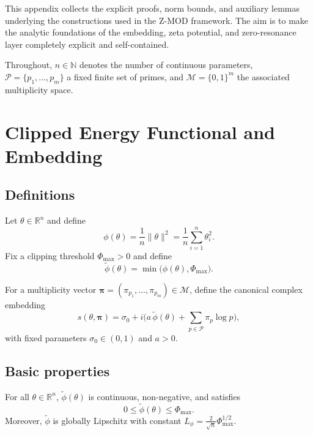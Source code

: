 \documentclass[11pt]{article}
\begin{document}
This appendix collects the explicit proofs, norm bounds, and auxiliary lemmas underlying the constructions used in the Z-MOD framework. The aim is to make the analytic foundations of the embedding, zeta potential, and zero-resonance layer completely explicit and self-contained.

Throughout, $n\in\mathbb{N}$ denotes the number of continuous parameters, $\mathcal{P}=\{p_1,\dots,p_m\}$ a fixed finite set of primes, and $\mathcal{M}=\{0,1\}^m$ the associated multiplicity space.

\section{Clipped Energy Functional and Embedding}

\subsection{Definitions}

Let $\theta\in\mathbb{R}^n$ and define
\[
  \phi(\theta) = \frac{1}{n}\|\theta\|^2 = \frac{1}{n}\sum_{i=1}^n \theta_i^2.
\]
Fix a clipping threshold $\Phi_{\max} > 0$ and define
\[
  \tilde{\phi}(\theta) = \min\big(\phi(\theta),\Phi_{\max}\big).
\]

For a multiplicity vector $\bm{\pi} = (\pi_{p_1},\dots,\pi_{p_m})\in\mathcal{M}$, define the canonical complex embedding
\begin{equation}
  s(\theta,\bm{\pi})
    = \sigma_0 + i\bigg(a\,\tilde{\phi}(\theta) + \sum_{p\in\mathcal{P}} \pi_p \log p\bigg),
  \label{A:eq:embedding}
\end{equation}
with fixed parameters $\sigma_0\in(0,1)$ and $a>0$.

\subsection{Basic properties}

\begin{lemma}
For all $\theta\in\mathbb{R}^n$, $\tilde{\phi}(\theta)$ is continuous, non-negative, and satisfies
\[
  0 \le \tilde{\phi}(\theta) \le \Phi_{\max}.
\]
Moreover, $\tilde{\phi}$ is globally Lipschitz with constant $L_\phi = \frac{2}{\sqrt{n}}\Phi_{\max}^{1/2}$.
\end{lemma}
\end{document}
